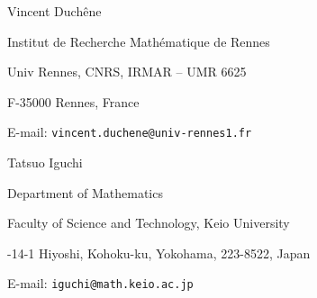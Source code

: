 \documentclass[11pt,leqno]{article}
\numberwithin{equation}{section}
\numberwithin{figure}{section}
\begin{document}
\bigskip
Vincent Duch\^ene \par
{\sc Institut de Recherche Math\'ematique de Rennes} \par
{\sc Univ Rennes}, CNRS, IRMAR -- UMR 6625 \par
{\sc F-35000 Rennes, France} \par
E-mail: \texttt{vincent.duchene@univ-rennes1.fr}


\bigskip
Tatsuo Iguchi \par
{\sc Department of Mathematics} \par
{\sc Faculty of Science and Technology, Keio University} \par
{-14-1 Hiyoshi, Kohoku-ku, Yokohama, 223-8522, Japan} \par
E-mail: \texttt{iguchi@math.keio.ac.jp}
\end{document}
